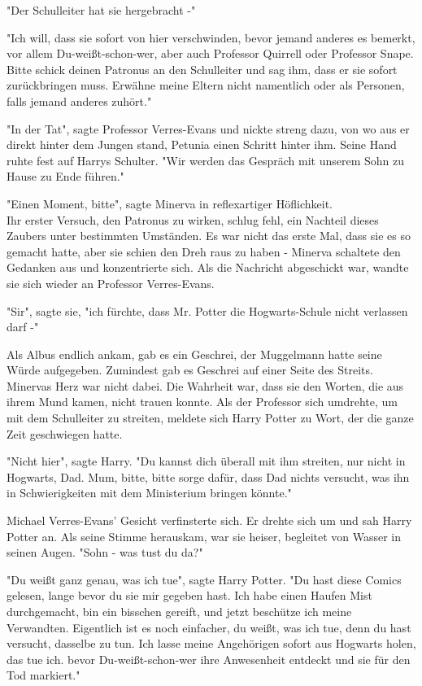 {"Der Schulleiter hat sie hergebracht -"

"Ich will, dass sie sofort von hier verschwinden, bevor jemand anderes es bemerkt, vor allem Du-weißt-schon-wer, aber auch Professor Quirrell oder Professor Snape. Bitte schick deinen Patronus an den Schulleiter und sag ihm, dass er sie sofort zurückbringen muss. Erwähne meine Eltern nicht namentlich oder als Personen, falls jemand anderes zuhört."

"In der Tat", sagte Professor Verres-Evans und nickte streng dazu, von wo aus er direkt hinter dem Jungen stand, Petunia einen Schritt hinter ihm. Seine Hand ruhte fest auf Harrys Schulter. "Wir werden das Gespräch mit unserem Sohn zu Hause zu Ende führen."

"Einen Moment, bitte", sagte Minerva in reflexartiger Höflichkeit.\\ Ihr erster Versuch, den Patronus zu wirken, schlug fehl, ein Nachteil dieses Zaubers unter bestimmten Umständen. Es war nicht das erste Mal, dass sie es so gemacht hatte, aber sie schien den Dreh raus zu haben - Minerva schaltete den Gedanken aus und konzentrierte sich. Als die Nachricht abgeschickt war, wandte sie sich wieder an Professor Verres-Evans.

"Sir", sagte sie, "ich fürchte, dass Mr. Potter die Hogwarts-Schule nicht verlassen darf -"

Als Albus endlich ankam, gab es ein Geschrei, der Muggelmann hatte seine Würde aufgegeben. Zumindest gab es Geschrei auf einer Seite des Streits. Minervas Herz war nicht dabei. Die Wahrheit war, dass sie den Worten, die aus ihrem Mund kamen, nicht trauen konnte. Als der Professor sich umdrehte, um mit dem Schulleiter zu streiten, meldete sich Harry Potter zu Wort, der die ganze Zeit geschwiegen hatte.

"Nicht hier", sagte Harry. "Du kannst dich überall mit ihm streiten, nur nicht in Hogwarts, Dad. Mum, bitte, bitte sorge dafür, dass Dad nichts versucht, was ihn in Schwierigkeiten mit dem Ministerium bringen könnte."

Michael Verres-Evans' Gesicht verfinsterte sich. Er drehte sich um und sah Harry Potter an. Als seine Stimme herauskam, war sie heiser, begleitet von Wasser in seinen Augen. "Sohn - was tust du da?"

"Du weißt ganz genau, was ich tue", sagte Harry Potter. "Du hast diese Comics gelesen, lange bevor du sie mir gegeben hast. Ich habe einen Haufen Mist durchgemacht, bin ein bisschen gereift, und jetzt beschütze ich meine Verwandten. Eigentlich ist es noch einfacher, du weißt, was ich tue, denn du hast versucht, dasselbe zu tun. Ich lasse meine Angehörigen sofort aus Hogwarts holen, das tue ich. bevor Du-weißt-schon-wer ihre Anwesenheit entdeckt und sie für den Tod markiert."

}
